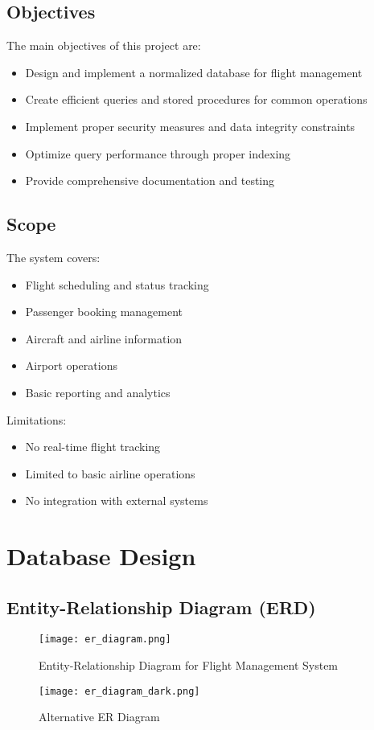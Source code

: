 \documentclass[a4paper,12pt]{article}
\begin{document}
\subsection{Objectives}
The main objectives of this project are:
\begin{itemize}
    \item Design and implement a normalized database for flight management
    \item Create efficient queries and stored procedures for common operations
    \item Implement proper security measures and data integrity constraints
    \item Optimize query performance through proper indexing
    \item Provide comprehensive documentation and testing
\end{itemize}

\subsection{Scope}
The system covers:
\begin{itemize}
    \item Flight scheduling and status tracking
    \item Passenger booking management
    \item Aircraft and airline information
    \item Airport operations
    \item Basic reporting and analytics
\end{itemize}

Limitations:
\begin{itemize}
    \item No real-time flight tracking
    \item Limited to basic airline operations
    \item No integration with external systems
\end{itemize}

\section{Database Design}
\subsection{Entity-Relationship Diagram (ERD)}
\begin{figure}[htbp]
    \centering
    \begin{minipage}{0.48\textwidth}
        \centering
        \texttt{[image: er\_diagram.png]}
        \caption{Entity-Relationship Diagram for Flight Management System}
        \label{fig:erd}
    \end{minipage}\hfill
    \begin{minipage}{0.48\textwidth}
        \centering
        \texttt{[image: er\_diagram\_dark.png]}
        \caption{Alternative ER Diagram}
        \label{fig:erd-dark}
    \end{minipage}
\end{figure}
\end{document}
